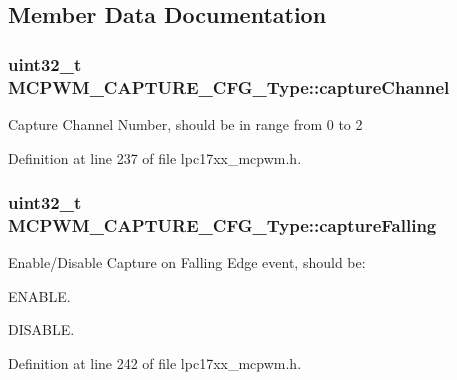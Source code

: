 \subsection{\-Member \-Data \-Documentation}
\hypertarget{struct_m_c_p_w_m___c_a_p_t_u_r_e___c_f_g___type_accecaec18f5966eea170659075341381}{
\subsubsection[{capture\-Channel}]{\setlength{\rightskip}{0pt plus 5cm}uint32\-\_\-t {\bf \-M\-C\-P\-W\-M\-\_\-\-C\-A\-P\-T\-U\-R\-E\-\_\-\-C\-F\-G\-\_\-\-Type\-::capture\-Channel}}}\label{struct_m_c_p_w_m___c_a_p_t_u_r_e___c_f_g___type_accecaec18f5966eea170659075341381}
\-Capture \-Channel \-Number, should be in range from 0 to 2 

\-Definition at line 237 of file lpc17xx\-\_\-mcpwm.\-h.

\hypertarget{struct_m_c_p_w_m___c_a_p_t_u_r_e___c_f_g___type_af87795404c1d636839473130a9f86034}{
\subsubsection[{capture\-Falling}]{\setlength{\rightskip}{0pt plus 5cm}uint32\-\_\-t {\bf \-M\-C\-P\-W\-M\-\_\-\-C\-A\-P\-T\-U\-R\-E\-\_\-\-C\-F\-G\-\_\-\-Type\-::capture\-Falling}}}\label{struct_m_c_p_w_m___c_a_p_t_u_r_e___c_f_g___type_af87795404c1d636839473130a9f86034}
\-Enable/\-Disable \-Capture on \-Falling \-Edge event, should be\-:
\begin{DoxyItemize}
\item \-E\-N\-A\-B\-L\-E.
\item \-D\-I\-S\-A\-B\-L\-E. 
\end{DoxyItemize}

\-Definition at line 242 of file lpc17xx\-\_\-mcpwm.\-h.

